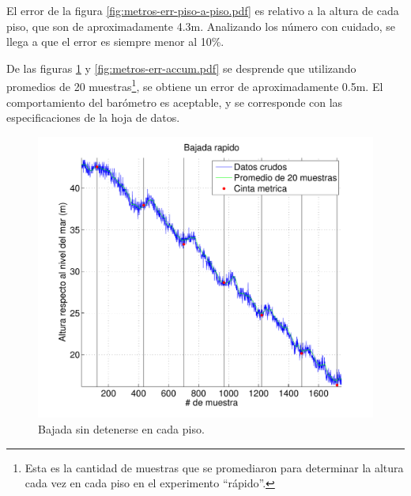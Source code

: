 \documentclass[spanish,12pt,a4paper,titlepage]{report}
\begin{document}
El error de la figura \ref{fig:metros-err-piso-a-piso.pdf} es relativo a la altura de cada piso, que son de aproximadamente 4.3m. Analizando los número con cuidado, se llega a que el error es siempre menor al 10\%.

De las figuras \ref{fig:metros-rapido.pdf} y \ref{fig:metros-err-accum.pdf} se desprende que utilizando promedios de 20 muestras\footnote{Esta es la cantidad de muestras que se promediaron para determinar la altura cada vez en cada piso en el experimento ``rápido''.}, se obtiene un error de aproximadamente 0.5m. El comportamiento del barómetro es aceptable, y se corresponde con las especificaciones de la hoja de datos.


\newpage
\vspace{-40pt}
\begin{figure}[h!]
\centering
  \includegraphics[width=.95\textwidth]{./pics/metros-rapido.pdf}
  \caption{Bajada sin detenerse en cada piso.}
  \label{fig:metros-rapido.pdf}
\end{figure}
\end{document}
